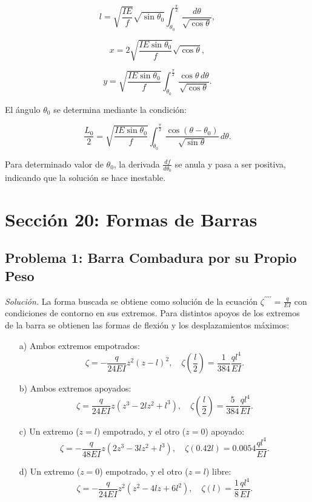 \documentclass{article}
\begin{document}
$$
l = \sqrt{\frac{IE}{f}} \sqrt{\sin \theta_0} \int_{\theta_0}^{\frac{\pi}{2}} \frac{d\theta}{\sqrt{\cos \theta}},
$$

$$
x = 2 \sqrt{\frac{IE \sin \theta_0}{f}} \sqrt{\cos \theta},
$$

$$
y = \sqrt{\frac{IE \sin \theta_0}{f}} \int_{\theta_0}^{\frac{\pi}{2}} \frac{\cos \theta \, d\theta}{\sqrt{\cos \theta}}.
$$

El ángulo $\theta_0$ se determina mediante la condición:

$$
\frac{L_0}{2} = \sqrt{\frac{IE \sin \theta_0}{f}} \int_{\theta_0}^{\frac{\pi}{2}} \frac{\cos (\theta - \theta_0)}{\sqrt{\sin \theta}} \, d\theta.
$$

Para determinado valor de $\theta_0$, la derivada $\frac{df}{d\theta_0}$ se anula y pasa a ser positiva, indicando que la solución se hace inestable.

\section*{Sección 20: Formas de Barras}

\subsection*{Problema 1: Barra Combadura por su Propio Peso}

\textit{Solución.} La forma buscada se obtiene como solución de la ecuación $\zeta^{\prime\prime\prime\prime} = \frac{q}{EI}$ con condiciones de contorno en sus extremos. Para distintos apoyos de los extremos de la barra se obtienen las formas de flexión y los desplazamientos máximos:

\begin{enumerate}
    \item[a)] Ambos extremos empotrados:
    $$
    \zeta = -\frac{q}{24EI} z^2(z-l)^2, \quad \zeta\left(\frac{l}{2}\right) = \frac{1}{384} \frac{ql^4}{EI}.
    $$

    \item[b)] Ambos extremos apoyados:
    $$
    \zeta = \frac{q}{24EI} z(z^3 - 2lz^2 + l^3), \quad \zeta\left(\frac{l}{2}\right) = \frac{5}{384} \frac{ql^4}{EI}.
    $$

    \item[c)] Un extremo ($z = l$) empotrado, y el otro ($z = 0$) apoyado:
    $$
    \zeta = -\frac{q}{48EI} z(2z^3 - 3lz^2 + l^3), \quad \zeta(0.42l) = 0.0054 \frac{ql^4}{EI}.
    $$

    \item[d)] Un extremo ($z = 0$) empotrado, y el otro ($z = l$) libre:
    $$
    \zeta = -\frac{q}{24EI} z^2(z^2 - 4lz + 6l^2), \quad \zeta(l) = \frac{1}{8} \frac{ql^4}{EI}.
    $$
\end{enumerate}
\end{document}
